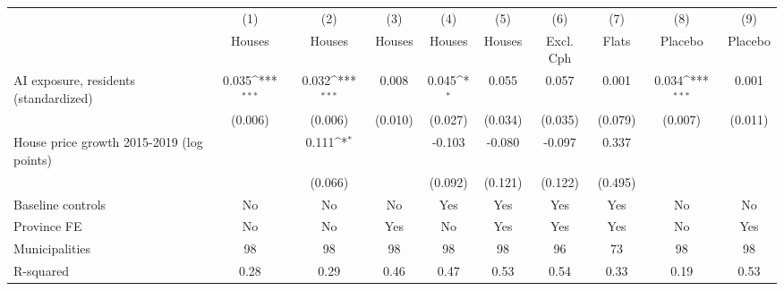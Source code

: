 {
\def\sym#1{\ifmmode^{#1}\else\(^{#1}\)\fi}
\begin{tabular}{l*{9}{c}}
\toprule
                    &\multicolumn{1}{c}{(1)}&\multicolumn{1}{c}{(2)}&\multicolumn{1}{c}{(3)}&\multicolumn{1}{c}{(4)}&\multicolumn{1}{c}{(5)}&\multicolumn{1}{c}{(6)}&\multicolumn{1}{c}{(7)}&\multicolumn{1}{c}{(8)}&\multicolumn{1}{c}{(9)}\\
                    &\multicolumn{1}{c}{Houses}&\multicolumn{1}{c}{Houses}&\multicolumn{1}{c}{Houses}&\multicolumn{1}{c}{Houses}&\multicolumn{1}{c}{Houses}&\multicolumn{1}{c}{Excl. Cph}&\multicolumn{1}{c}{Flats}&\multicolumn{1}{c}{Placebo}&\multicolumn{1}{c}{Placebo}\\
\midrule
AI exposure, residents (standardized)&       0.035\sym{***}&       0.032\sym{***}&       0.008         &       0.045\sym{*}  &       0.055         &       0.057         &       0.001         &       0.034\sym{***}&       0.001         \\
                    &     (0.006)         &     (0.006)         &     (0.010)         &     (0.027)         &     (0.034)         &     (0.035)         &     (0.079)         &     (0.007)         &     (0.011)         \\
\addlinespace
House price growth 2015-2019 (log points)&                     &       0.111\sym{*}  &                     &      -0.103         &      -0.080         &      -0.097         &       0.337         &                     &                     \\
                    &                     &     (0.066)         &                     &     (0.092)         &     (0.121)         &     (0.122)         &     (0.495)         &                     &                     \\
\addlinespace
Baseline controls   &          No         &          No         &          No         &         Yes         &         Yes         &         Yes         &         Yes         &          No         &          No         \\
\addlinespace
Province FE         &          No         &          No         &         Yes         &          No         &         Yes         &         Yes         &         Yes         &          No         &         Yes         \\
\midrule
Municipalities      &          98         &          98         &          98         &          98         &          98         &          96         &          73         &          98         &          98         \\
R-squared           &        0.28         &        0.29         &        0.46         &        0.47         &        0.53         &        0.54         &        0.33         &        0.19         &        0.53         \\
\bottomrule
\end{tabular}
}
